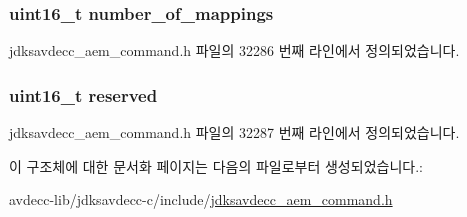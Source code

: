 \subsubsection[{\texorpdfstring{number\+\_\+of\+\_\+mappings}{number_of_mappings}}]{\setlength{\rightskip}{0pt plus 5cm}uint16\+\_\+t number\+\_\+of\+\_\+mappings}\hypertarget{structjdksavdecc__aem__command__add__sensor__mappings_ac7db472c5622ef473d5d0a5c416d5531}{}\label{structjdksavdecc__aem__command__add__sensor__mappings_ac7db472c5622ef473d5d0a5c416d5531}


jdksavdecc\+\_\+aem\+\_\+command.\+h 파일의 32286 번째 라인에서 정의되었습니다.

\subsubsection[{\texorpdfstring{reserved}{reserved}}]{\setlength{\rightskip}{0pt plus 5cm}uint16\+\_\+t reserved}\hypertarget{structjdksavdecc__aem__command__add__sensor__mappings_a5a6ed8c04a3db86066924b1a1bf4dad3}{}\label{structjdksavdecc__aem__command__add__sensor__mappings_a5a6ed8c04a3db86066924b1a1bf4dad3}


jdksavdecc\+\_\+aem\+\_\+command.\+h 파일의 32287 번째 라인에서 정의되었습니다.



이 구조체에 대한 문서화 페이지는 다음의 파일로부터 생성되었습니다.\+:\begin{DoxyCompactItemize}
\item 
avdecc-\/lib/jdksavdecc-\/c/include/\hyperlink{jdksavdecc__aem__command_8h}{jdksavdecc\+\_\+aem\+\_\+command.\+h}\end{DoxyCompactItemize}
